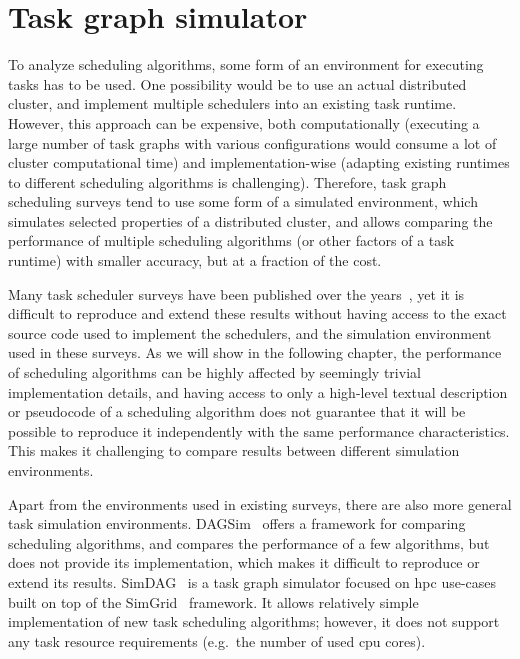 \section{Task graph simulator}
\label{sec:estee-simulator}
To analyze scheduling algorithms, some form of an environment for executing tasks has to be used.
One possibility would be to use an actual distributed cluster, and implement multiple schedulers
into an existing task runtime. However, this approach can be expensive, both computationally
(executing a large number of task graphs with various configurations would consume a lot of cluster
computational time) and implementation-wise (adapting existing runtimes to different scheduling
algorithms is challenging). Therefore, task graph scheduling surveys tend to use some form of a
simulated environment, which simulates selected properties of a distributed cluster, and allows
comparing the performance of multiple scheduling algorithms (or other factors of a task runtime)
with smaller accuracy, but at a fraction of the cost.

Many task scheduler surveys have been published over the years~\cite{hlfet1974, kwok1998benchmarking, hagras2003static, sinnen2005, wang2018list}, yet it is
difficult to reproduce and extend these results without having access to the exact source code used
to implement the schedulers, and the simulation environment used in these surveys. As we will show
in the following chapter, the performance of scheduling algorithms can be highly affected by
seemingly trivial implementation details, and having access to only a high-level textual
description or pseudocode of a scheduling algorithm does not guarantee that it will be possible to
reproduce it independently with the same performance characteristics. This makes it challenging to
compare results between different simulation environments.

Apart from the environments used in existing surveys, there are also more general task simulation
environments. DAGSim~\cite{dagsim} offers a framework for comparing scheduling
algorithms, and compares the performance of a few algorithms, but does not provide its
implementation, which makes it difficult to reproduce or extend its results.
SimDAG~\cite{simdag} is a task graph simulator focused on \gls{hpc}
use-cases built on top of the SimGrid~\cite{simgrid} framework. It allows relatively
simple implementation of new task scheduling algorithms; however, it does not support any task
resource requirements (e.g.\ the number of used \gls{cpu} cores).

